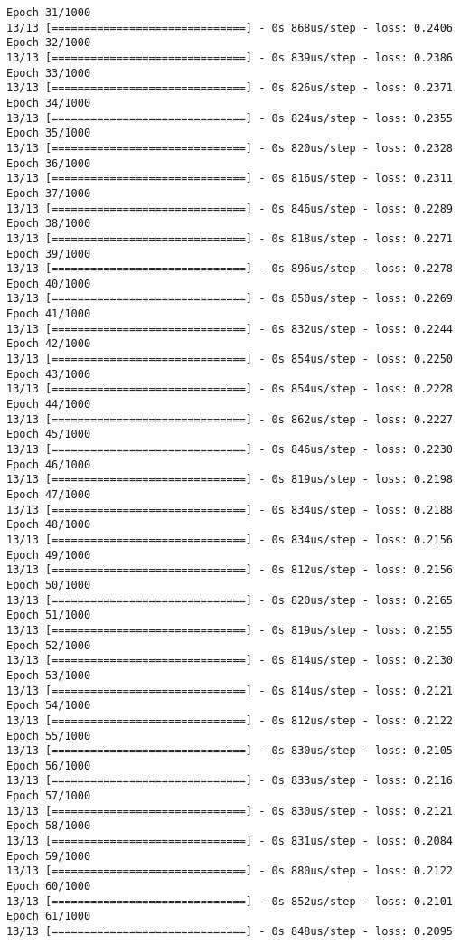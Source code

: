 \documentclass[11pt]{article}
\begin{document}
\begin{Verbatim}[commandchars=\\\{\}]
Epoch 31/1000
13/13 [==============================] - 0s 868us/step - loss: 0.2406
Epoch 32/1000
13/13 [==============================] - 0s 839us/step - loss: 0.2386
Epoch 33/1000
13/13 [==============================] - 0s 826us/step - loss: 0.2371
Epoch 34/1000
13/13 [==============================] - 0s 824us/step - loss: 0.2355
Epoch 35/1000
13/13 [==============================] - 0s 820us/step - loss: 0.2328
Epoch 36/1000
13/13 [==============================] - 0s 816us/step - loss: 0.2311
Epoch 37/1000
13/13 [==============================] - 0s 846us/step - loss: 0.2289
Epoch 38/1000
13/13 [==============================] - 0s 818us/step - loss: 0.2271
Epoch 39/1000
13/13 [==============================] - 0s 896us/step - loss: 0.2278
Epoch 40/1000
13/13 [==============================] - 0s 850us/step - loss: 0.2269
Epoch 41/1000
13/13 [==============================] - 0s 832us/step - loss: 0.2244
Epoch 42/1000
13/13 [==============================] - 0s 854us/step - loss: 0.2250
Epoch 43/1000
13/13 [==============================] - 0s 854us/step - loss: 0.2228
Epoch 44/1000
13/13 [==============================] - 0s 862us/step - loss: 0.2227
Epoch 45/1000
13/13 [==============================] - 0s 846us/step - loss: 0.2230
Epoch 46/1000
13/13 [==============================] - 0s 819us/step - loss: 0.2198
Epoch 47/1000
13/13 [==============================] - 0s 834us/step - loss: 0.2188
Epoch 48/1000
13/13 [==============================] - 0s 834us/step - loss: 0.2156
Epoch 49/1000
13/13 [==============================] - 0s 812us/step - loss: 0.2156
Epoch 50/1000
13/13 [==============================] - 0s 820us/step - loss: 0.2165
Epoch 51/1000
13/13 [==============================] - 0s 819us/step - loss: 0.2155
Epoch 52/1000
13/13 [==============================] - 0s 814us/step - loss: 0.2130
Epoch 53/1000
13/13 [==============================] - 0s 814us/step - loss: 0.2121
Epoch 54/1000
13/13 [==============================] - 0s 812us/step - loss: 0.2122
Epoch 55/1000
13/13 [==============================] - 0s 830us/step - loss: 0.2105
Epoch 56/1000
13/13 [==============================] - 0s 833us/step - loss: 0.2116
Epoch 57/1000
13/13 [==============================] - 0s 830us/step - loss: 0.2121
Epoch 58/1000
13/13 [==============================] - 0s 831us/step - loss: 0.2084
Epoch 59/1000
13/13 [==============================] - 0s 880us/step - loss: 0.2122
Epoch 60/1000
13/13 [==============================] - 0s 852us/step - loss: 0.2101
Epoch 61/1000
13/13 [==============================] - 0s 848us/step - loss: 0.2095

\end{Verbatim}
\end{document}
